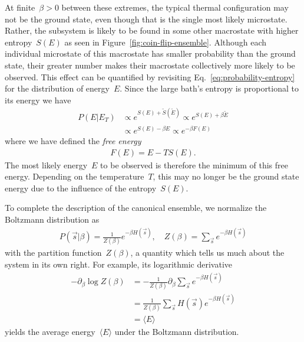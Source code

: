 At finite~$\beta > 0$ between these extremes, the typical thermal configuration may not be the ground state, even though that is the single most likely microstate. Rather, the subsystem is likely to be found in some other macrostate with higher entropy~$S(E)$ as seen in Figure~\ref{fig:coin-flip-ensemble}. Although each individual microstate of this macrostate has smaller probability than the ground state, their greater number makes their macrostate collectively more likely to be observed. This effect can be quantified by revisiting Eq.~\eqref{eq:probability-entropy} for the distribution of energy~$E$. Since the large bath's entropy is proportional to its energy we have \begin{align}
    P(E|E_T) &\propto e^{S(E) + \tilde{S}(\tilde{E})} \propto e^{S(E) + \beta \tilde{E}} \nonumber \\
            &\propto e^{S(E) - \beta E} \propto e^{-\beta F(E)}
\end{align}
where we have defined the \emph{free energy} \begin{align}
    F(E) = E - T S(E).
\end{align}
The most likely energy~$E$ to be observed is therefore the minimum of this free energy. Depending on the temperature~$T$, this may no longer be the ground state energy due to the influence of the entropy~$S(E)$.

To complete the description of the canonical ensemble, we normalize the Boltzmann distribution as \begin{align}
    P(\vec{s}|\beta) = \frac{1}{Z(\beta)}e^{-\beta H(\vec{s})}, \quad Z(\beta) = \sum_{\vec{s}} e^{-\beta H(\vec{s})} \label{eq:boltzmann-distribution}
\end{align}
with the partition function~$Z(\beta)$, a quantity which tells us much about the system in its own right. For example, its logarithmic derivative \begin{align}
    - \partial_\beta \log Z(\beta) &= - \frac{1}{Z(\beta)} \partial_\beta \sum_{\vec{s}} e^{-\beta H(\vec{s})} \nonumber \\
    &= \frac{1}{Z(\beta)} \sum_{\vec{s}} H(\vec{s}) e^{-\beta H(\vec{s})} \nonumber \\
    &= \langle E \rangle \label{eq:average-energy-partition-function}
\end{align}
yields the average energy~$\langle E \rangle$ under the Boltzmann distribution.

